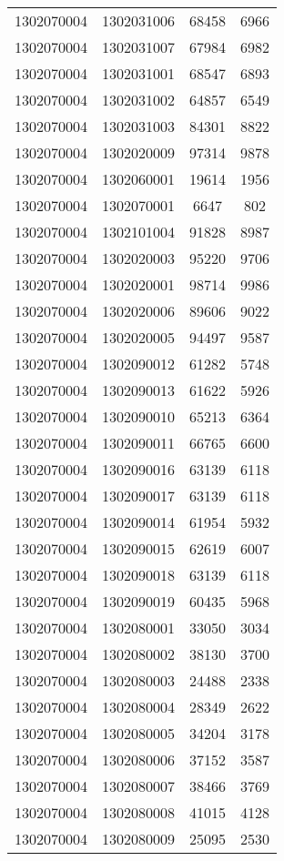\begin{longtable}[h]{llcc}
		1302070004 & 1302031006 & 68458 & 6966\\
		1302070004 & 1302031007 & 67984 & 6982\\
		1302070004 & 1302031001 & 68547 & 6893\\
		1302070004 & 1302031002 & 64857 & 6549\\
		1302070004 & 1302031003 & 84301 & 8822\\
		1302070004 & 1302020009 & 97314 & 9878\\
		1302070004 & 1302060001 & 19614 & 1956\\
		1302070004 & 1302070001 & 6647 & 802\\
		1302070004 & 1302101004 & 91828 & 8987\\
		1302070004 & 1302020003 & 95220 & 9706\\
		1302070004 & 1302020001 & 98714 & 9986\\
		1302070004 & 1302020006 & 89606 & 9022\\
		1302070004 & 1302020005 & 94497 & 9587\\
		1302070004 & 1302090012 & 61282 & 5748\\
		1302070004 & 1302090013 & 61622 & 5926\\
		1302070004 & 1302090010 & 65213 & 6364\\
		1302070004 & 1302090011 & 66765 & 6600\\
		1302070004 & 1302090016 & 63139 & 6118\\
		1302070004 & 1302090017 & 63139 & 6118\\
		1302070004 & 1302090014 & 61954 & 5932\\
		1302070004 & 1302090015 & 62619 & 6007\\
		1302070004 & 1302090018 & 63139 & 6118\\
		1302070004 & 1302090019 & 60435 & 5968\\
		1302070004 & 1302080001 & 33050 & 3034\\
		1302070004 & 1302080002 & 38130 & 3700\\
		1302070004 & 1302080003 & 24488 & 2338\\
		1302070004 & 1302080004 & 28349 & 2622\\
		1302070004 & 1302080005 & 34204 & 3178\\
		1302070004 & 1302080006 & 37152 & 3587\\
		1302070004 & 1302080007 & 38466 & 3769\\
		1302070004 & 1302080008 & 41015 & 4128\\
		1302070004 & 1302080009 & 25095 & 2530\\

\end{longtable}
